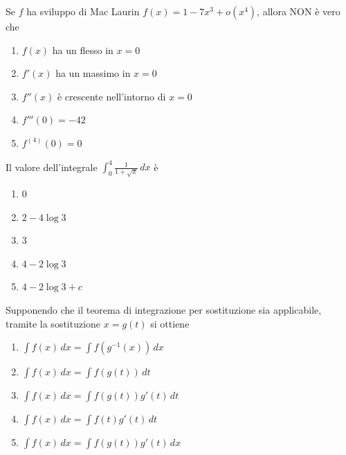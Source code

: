 \begin{quiz}
Se $f$ ha sviluppo di Mac Laurin $f(x)=1-7x^3+o(x^4)$, allora NON \`e vero che
\begin{enumerate}
\item $f(x)$ ha un flesso in $x=0$
\item $f'(x)$ ha un massimo in $x=0$
\item $f''(x)$ \`e crescente nell'intorno di $x=0$
\item $f'''(0)=-42$
\item $f^{(4)}(0)=0$
\end{enumerate}
\end{quiz}

\begin{quiz}
Il valore dell'integrale $\displaystyle\int_0^4\frac{1}{1+\sqrt{x}}\,dx$ \`e
\begin{enumerate}
\item $0$
\item $2-4\log3$
\item $3$
\item $4-2\log3$
\item $4-2\log3+c$
\end{enumerate}
\end{quiz}

\begin{quiz}
Supponendo che il teorema di integrazione per sostituzione sia applicabile, tramite la sostituzione $x=g(t)$ si ottiene
\begin{enumerate}
\item $\int f(x)\,dx=\int f(g^{-1}(x))\,dx$
\item $\int f(x)\,dx=\int f(g(t))\,dt$
\item $\int f(x)\,dx=\int f(g(t))g'(t)\,dt$
\item $\int f(x)\,dx=\int f(t)g'(t)\,dt$
\item $\int f(x)\,dx=\int f(g(t))g'(t)\,dx$
\end{enumerate}
\end{quiz}

